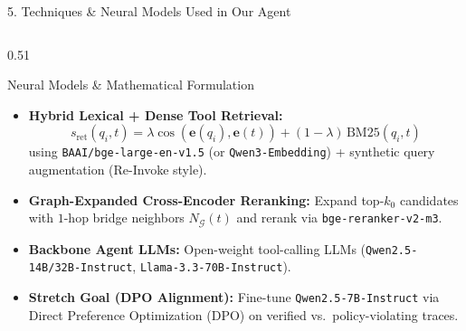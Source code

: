 \documentclass[aspectratio=169, 10pt]{beamer}
\begin{document}
\begin{frame}{5. Techniques \& Neural Models Used in Our Agent}
\begin{columns}[T, onlytextwidth]
\begin{column}{0.51\textwidth}
\begin{block}{Neural Models \& Mathematical Formulation}
\footnotesize
\begin{itemize}
    \item \textbf{Hybrid Lexical + Dense Tool Retrieval:}
    $$s_{\text{ret}}(q_i, t) = \lambda \cos(\mathbf{e}(q_i), \mathbf{e}(t)) + (1-\lambda)\,\text{BM25}(q_i, t)$$
    using \texttt{BAAI/bge-large-en-v1.5} (or \texttt{Qwen3-Embedding}) + synthetic query augmentation (Re-Invoke style).
    \item \textbf{Graph-Expanded Cross-Encoder Reranking:}
    Expand top-$k_0$ candidates with $1$-hop bridge neighbors $N_{\mathcal{G}}(t)$ and rerank via \texttt{bge-reranker-v2-m3}.
    \item \textbf{Backbone Agent LLMs:}
    Open-weight tool-calling LLMs (\texttt{Qwen2.5-14B/32B-Instruct}, \texttt{Llama-3.3-70B-Instruct}).
    \item \textbf{Stretch Goal (DPO Alignment):}
    Fine-tune \texttt{Qwen2.5-7B-Instruct} via Direct Preference Optimization (DPO) on verified vs.\ policy-violating traces.
\end{itemize}
\end{block}
\end{column}


\end{columns}
\end{frame}
\end{document}
